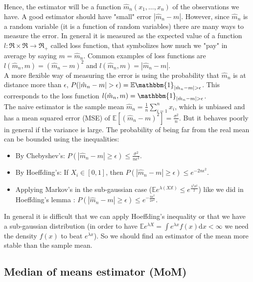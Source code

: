 \documentclass[11pt, english]{article}
\begin{document}
Hence, the estimator will be a function $\hat{m}_n(x_1,\dots,x_n)$ of the observations we have. A good estimator should have "small" error $|\hat{m}_n-m|$. However, since $\hat{m}_n$ is a random variable (it is a function of random variables) there are many ways to measure the error. In general it is measured as the expected value of a function $l:\Re\times\Re\rightarrow\Re_+$ called loss function, that symbolizes how much we "pay" in average by saying $m=\hat{m}_n$. Common examples of loss functions are $l(\hat{m}_n,m)=(\hat{m}_n-m)^2$ and $l(\hat{m}_n,m)=|\hat{m}_n-m|$. \\
A more flexible way of measuring the error is using the probability that $\hat{m}_n$ is at distance more than $\epsilon$, $P(|\hat{m}_n-m|>\epsilon)=\mathbb{E}\mathbbm{1}_{|\hat{m}_n-m|>\epsilon}$. This corresponds to the loss function $l(\hat{m}_n,m)=\mathbbm{1}_{|\hat{m}_n-m|>\epsilon}$.\\

The naive estimator is the sample mean $\hat{m}_n=\frac{1}{n}\sum\limits_{i=1}^n x_i$, which is unbiased and has a mean squared error (MSE) of $\mathbb{E}[(\hat{m}_n-m)^2]=\frac{\sigma^2}{n}$. But it behaves poorly in general if the variance is large. The probability of being far from the real mean can be bounded using the inequalities:
\begin{itemize}
	\item By Chebyshev's: $P(|\hat{m}_n-m|\geq \epsilon)\leq\frac{\sigma^2}{n\epsilon^2}$.
	\item By Hoeffding's: If $X_i\in [0,1]$, then $P(|\hat{m}_n-m|\geq \epsilon)\leq e^{-2n\epsilon^2}$.
	\item Applying Markov's in the sub-gaussian case ($\mathbb{E}e^{\lambda(X\mathbb{X})}\leq e^{\frac{\lambda^2\sigma^2}{2}}$) like we did in Hoeffding's lemma : $P(|\hat{m}_n-m|\geq \epsilon)\leq e^{-\frac{n\epsilon^2}{2\sigma^2}}$. 
\end{itemize}
In general it is difficult that we can apply Hoeffding's inequality or that we have a sub-gaussian distribution (in order to have $\mathbb{E}e^{\lambda X}=\int e^{\lambda x}f(x)\text{d}x<\infty$ we need the density $f(x)$ to beat $e^{\lambda x}$). So we should find an estimator of the mean more stable than the sample mean.

\subsection{Median of means estimator (MoM)}
\end{document}
